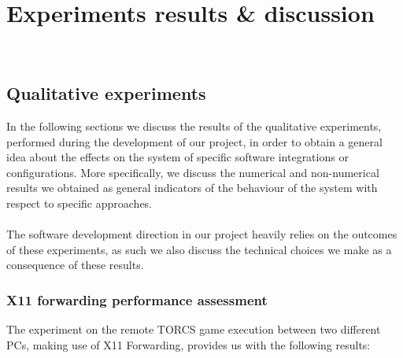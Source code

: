 
\chapter{Experiments results \& discussion}
\label{cap:results-discussion}
\\

\section{Qualitative experiments}
In the following sections we discuss the results of the qualitative experiments, performed during the development of our project, in order to obtain a general idea about the effects on the system of specific software integrations or configurations. More specifically, we discuss the numerical and non-numerical results we obtained as general indicators of the behaviour of the system with respect to specific approaches. \\ \\
The software development direction in our project heavily relies on the outcomes of these experiments, as such we also discuss the technical choices we make as a consequence of these results.

\subsection{X11 forwarding performance assessment}
The experiment on the remote TORCS game execution between two different PCs, making use of X11 Forwarding, provides us with the following results:

